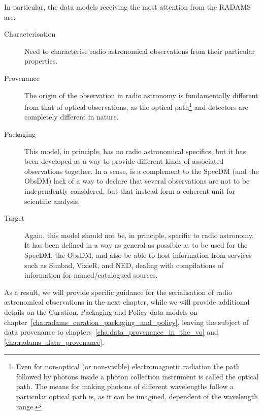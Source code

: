 		In particular, the data models receiving the most attention
		from the RADAMS are:
		
		\begin{description}
			\item[Characterisation] Need to characterise 
			radio astronomical observations from their particular
			properties.
			
			\item[Provenance] The origin of the observation in
			radio astronomy is fundamentally different from that
			of optical observations, as the optical
			path\footnote{Even for non-optical (or non-visible)
			electromagnetic radiation the path followed by photons
			inside a photon collection instrument is called the
			optical path. The means for making photons of different
			wavelengths follow a particular optical path is, as it
			can be imagined, dependent of the wavelength range.}
			and detectors are completely different in nature.
			
			\item[Packaging] This model, in principle, has no radio
			astronomical specifics, but it has been developed as a
			way to provide different kinds of associated
			observations together. In a sense, is a complement to
			the SpecDM (and the ObsDM) lack of a way to declare
			that several observations are not to be independently
			considered, but that instead form a coherent unit for
			scientific analysis.
			
			\item[Target] Again, this model should not be,
			in principle, specific to radio astronomy. It has
			been defined in a way as general as possible as to
			be used for the SpecDM, the ObsDM, and also be able
			to host information from services such as Simbad,
			VizieR, and NED, dealing with compilations of
			information for named/catalogued sources.
		\end{description}
		
		As a result, we will provide specific guidance for the
		serialisation of radio astronomical observations in the
		next chapter, while we will provide additional details on
		the Curation, Packaging and Policy data models on
		chapter~\ref{cha:radams_curation_packaging_and_policy},
		leaving the subject of data provenance to
		chapters~\ref{cha:data_provenance_in_the_vo} and
		\ref{cha:radams_data_provenance}.
	
	
